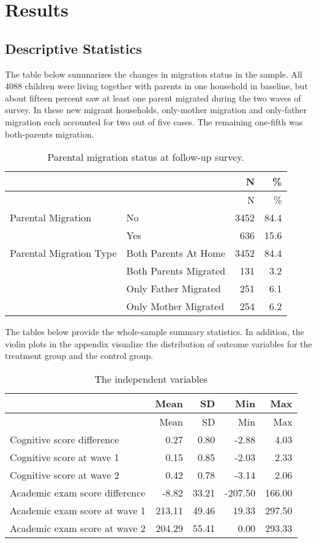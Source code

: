 \documentclass[
  man,floatsintext]{apa7}
\begin{document}
\newpage

\hypertarget{results}{%
\section{Results}\label{results}}

\hypertarget{descriptive-statistics}{%
\subsection{Descriptive Statistics}\label{descriptive-statistics}}

The table below summarizes the changes in migration status in the sample. All 4088 children were living together with parents in one household in baseline, but about fifteen percent saw at least one parent migrated during the two waves of survey. In these new migrant households, only-mother migration and only-father migration each accounted for two out of five cases. The remaining one-fifth was both-parents migration.

\begin{longtable}[]{@{}llrr@{}}
\caption{Parental migration status at follow-up survey.}\tabularnewline
\toprule
& & N & \% \\
\midrule
\endfirsthead
\toprule
& & N & \% \\
\midrule
\endhead
Parental Migration & No & 3452 & 84.4 \\
& Yes & 636 & 15.6 \\
Parental Migration Type & Both Parents At Home & 3452 & 84.4 \\
& Both Parents Migrated & 131 & 3.2 \\
& Only Father Migrated & 251 & 6.1 \\
& Only Mother Migrated & 254 & 6.2 \\
\bottomrule
\end{longtable}

The tables below provide the whole-sample summary statistics. In addition, the violin plots in the appendix visualize the distribution of outcome variables for the treatment group and the control group.

\begin{longtable}[]{@{}lrrrr@{}}
\caption{The independent variables}\tabularnewline
\toprule
& Mean & SD & Min & Max \\
\midrule
\endfirsthead
\toprule
& Mean & SD & Min & Max \\
\midrule
\endhead
Cognitive score difference & 0.27 & 0.80 & -2.88 & 4.03 \\
Cognitive score at wave 1 & 0.15 & 0.85 & -2.03 & 2.33 \\
Cognitive score at wave 2 & 0.42 & 0.78 & -3.14 & 2.06 \\
Academic exam score difference & -8.82 & 33.21 & -207.50 & 166.00 \\
Academic exam score at wave 1 & 213.11 & 49.46 & 19.33 & 297.50 \\
Academic exam score at wave 2 & 204.29 & 55.41 & 0.00 & 293.33 \\
\bottomrule
\end{longtable}
\end{document}
